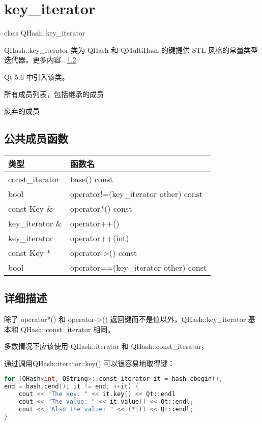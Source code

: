 \chapter{key\_iterator}

class QHash::key\_iterator

QHash::key\_iterator 类为 QHash 和 QMultiHash 的键提供 STL 风格的常量类型迭代器。更多内容...\ref{qhash_key_iterator:detail}

Qt 5.6 中引入该类。


\begin{compactitem}
\item 所有成员列表，包括继承的成员
\item 废弃的成员
\end{compactitem}

\splitLine

\section{公共成员函数}

\begin{tabular}{|l|l|}
\hline
类型	&函数名\\
\hline
const\_iterator& 	base() const\\
\hline
bool 	&operator!=(key\_iterator other) const\\
\hline
const Key \& &	operator*() const\\
\hline
key\_iterator \&& 	operator++()\\
\hline
key\_iterator &	operator++(int)\\
\hline
const Key * &	operator->() const\\
\hline
bool 	&operator==(key\_iterator other) const\\
\hline
\end{tabular}

\splitLine

\section{详细描述}\label{qhash_key_iterator:detail}

除了 operator*() 和 operator->() 返回键而不是值以外，QHash::key\_iterator 基本和 QHash::const\_iterator 相同。

多数情况下应该使用 QHash::iterator 和 QHash::const\_iterator，

通过调用QHash::iterator::key() 可以很容易地取得键：

\begin{lstlisting}[language=C++]
for (QHash<int, QString>::const_iterator it = hash.cbegin(), 
end = hash.cend(); it != end; ++it) {
    cout << "The key: " << it.key() << Qt::endl
    cout << "The value: " << it.value() << Qt::endl;
    cout << "Also the value: " << (*it) << Qt::endl;
}
\end{lstlisting}

